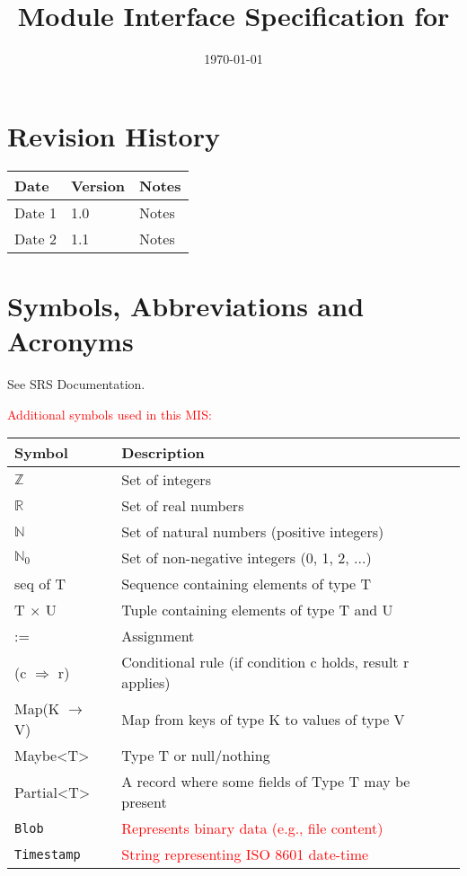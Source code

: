 \documentclass[12pt, titlepage]{article}
\begin{document}
\title{Module Interface Specification for \progname{}}

\author{\authname}

\date{\today}

\maketitle


\section{Revision History}

\begin{tabularx}{\textwidth}{p{3cm}p{2cm}X}
\toprule {\bf Date} & {\bf Version} & {\bf Notes}\\
\midrule
Date 1 & 1.0 & Notes\\
Date 2 & 1.1 & Notes\\
\bottomrule
\end{tabularx}

\newpage %

\section{Symbols, Abbreviations and Acronyms}

See SRS Documentation. %

\textcolor{red}{Additional symbols used in this MIS:}
\renewcommand{\arraystretch}{1.2}
\begin{tabular}{l l}
  \toprule
  \textbf{Symbol} & \textbf{Description}\\
  \midrule
  $\mathbb{Z}$ & Set of integers \\
  $\mathbb{R}$ & Set of real numbers \\
  $\mathbb{N}$ & Set of natural numbers (positive integers) \\
  $\mathbb{N}_0$ & Set of non-negative integers (0, 1, 2, ...) \\ %
  seq of T & Sequence containing elements of type T \\
  T $\times$ U & Tuple containing elements of type T and U \\
  := & Assignment \\
  (c $\Rightarrow$ r) & Conditional rule (if condition c holds, result r applies) \\
  Map(K $\rightarrow$ V) & Map from keys of type K to values of type V \\ %
  Maybe<T> & Type T or null/nothing \\ %
  Partial<T> & A record where some fields of Type T may be present \\ %
  \texttt{Blob} & \textcolor{red}{Represents binary data (e.g., file content)} \\ %
  \texttt{Timestamp} & \textcolor{red}{String representing ISO 8601 date-time} \\ %
  \bottomrule
\end{tabular}
\end{document}

